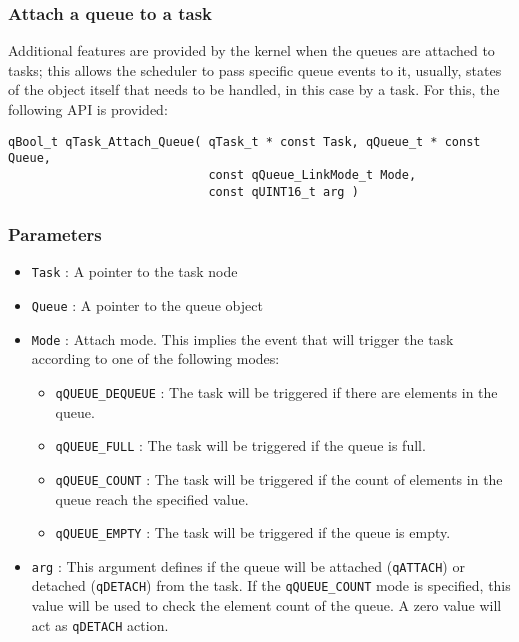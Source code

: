 \subsubsection{Attach a queue to a task}
Additional features are provided by the kernel when the queues are attached to tasks; this allows the scheduler to pass specific queue events to it, usually, states of the object itself that needs to be handled, in this case by a task. For this, the following API is provided:  
\medskip
    
\begin{lstlisting}[style=CStyle]
qBool_t qTask_Attach_Queue( qTask_t * const Task, qQueue_t * const Queue,
                            const qQueue_LinkMode_t Mode, 
                            const qUINT16_t arg )
\end{lstlisting}
    
\subsubsection*{Parameters}
\begin{itemize}
    \item \lstinline{Task} : A pointer to the task node
    \item \lstinline{Queue} : A pointer to the queue object
    \item \lstinline{Mode} : Attach mode. This implies the event that will trigger the task according to one of the following modes:
    \begin{itemize}
        \item \lstinline{qQUEUE_DEQUEUE} : The task will be triggered if there are elements in the queue. 
        \item \lstinline{qQUEUE_FULL} :  The task will be triggered if the queue is full. 
        \item \lstinline{qQUEUE_COUNT} :  The task will be triggered if the count of elements in the queue reach the specified value. 
        \item \lstinline{qQUEUE_EMPTY} :  The task will be triggered if the queue is empty.
    \end{itemize}
    \item \lstinline{arg} : This argument defines if the queue will be attached (\lstinline{qATTACH}) or detached (\lstinline{qDETACH}) from the task. If the \lstinline{qQUEUE_COUNT} mode is specified, this value will be used to check the element count of the queue. A zero value will act as \lstinline{qDETACH} action. 
\end{itemize}  

